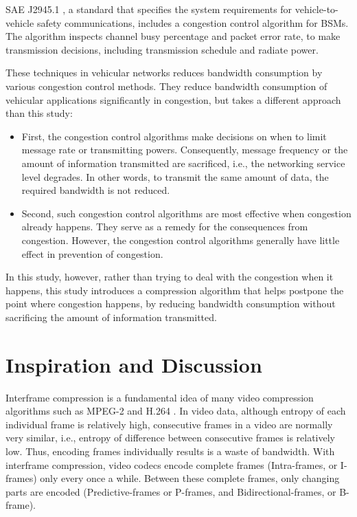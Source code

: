\documentclass[12pt]{report}
\begin{document}
SAE J2945.1 \cite{sae2016j29451}, a standard that specifies the system requirements for vehicle-to-vehicle safety communications, includes a congestion control algorithm for BSMs. The algorithm inspects channel busy percentage and packet error rate, to make transmission decisions, including transmission schedule and radiate power.

These techniques in vehicular networks reduces bandwidth consumption by various congestion control methods. They reduce bandwidth consumption of vehicular applications significantly in congestion, but takes a different approach than this study:

\begin{itemize}
  \item First, the congestion control algorithms make decisions on when to limit message rate or transmitting powers. Consequently, message frequency or the amount of information transmitted are sacrificed, i.e., the networking service level degrades. In other words, to transmit the same amount of data, the required bandwidth is not reduced.
  \item Second, such congestion control algorithms are most effective when congestion already happens. They serve as a remedy for the consequences from congestion. However, the congestion control algorithms generally have little effect in prevention of congestion.
\end{itemize}

In this study, however, rather than trying to deal with the congestion when it happens, this study introduces a compression algorithm that helps postpone the point where congestion happens, by reducing bandwidth consumption without sacrificing the amount of information transmitted.

\section{Inspiration and Discussion}

Interframe compression is a fundamental idea of many video compression algorithms such as MPEG-2 \cite{le1991mpeg} and H.264 \cite{wiegand2003h264}. In video data, although entropy of each individual frame is relatively high, consecutive frames in a video are normally very similar, i.e., entropy of difference between consecutive frames is relatively low. Thus, encoding frames individually results is a waste of bandwidth. With interframe compression, video codecs encode complete frames (Intra-frames, or I-frames) only every once a while. Between these complete frames, only changing parts are encoded (Predictive-frames or P-frames, and Bidirectional-frames, or B-frame).
\end{document}
